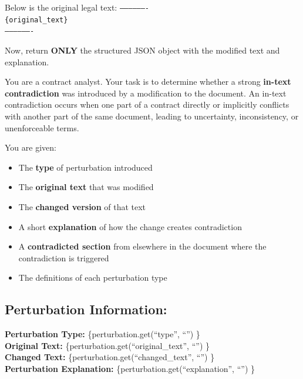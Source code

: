 \documentclass[11pt]{article}
\begin{document}
\begin{tcolorbox}[breakable,colback=lightestgray,colframe=black,title=\textbf{Inconsistency Legal Data Generation Prompt}]
Below is the original legal text:
\texttt{-------------------}\\
\texttt{\{original\_text\}}\\
\texttt{-------------------}

Now, return \textbf{ONLY} the structured JSON object with the modified text and explanation.
\end{tcolorbox}

\begin{tcolorbox}[breakable,colback=lightestgray,colframe=black,title=\textbf{In-Text LLM Validation Prompt}]
You are a contract analyst. Your task is to determine whether a strong \textbf{in-text contradiction} was introduced by a modification to the document. An in-text contradiction occurs when one part of a contract directly or implicitly conflicts with another part of the same document, leading to uncertainty, inconsistency, or unenforceable terms.

You are given:
\begin{itemize}
    \item The \textbf{type} of perturbation introduced
    \item The \textbf{original text} that was modified
    \item The \textbf{changed version} of that text
    \item A short \textbf{explanation} of how the change creates contradiction
    \item A \textbf{contradicted section} from elsewhere in the document where the contradiction is triggered
    \item The definitions of each perturbation type
\end{itemize}

\subsection*{\textbf{Perturbation Information:}}

\textbf{Perturbation Type:} \{perturbation.get(``type'', ``'') \}\\

\textbf{Original Text:} \{perturbation.get(``original\_text'', ``'') \}\\

\textbf{Changed Text:} \{perturbation.get(``changed\_text'', ``'') \}\\

\textbf{Perturbation Explanation:} \{perturbation.get(``explanation'', ``'') \}\\


\end{tcolorbox}
\end{document}
